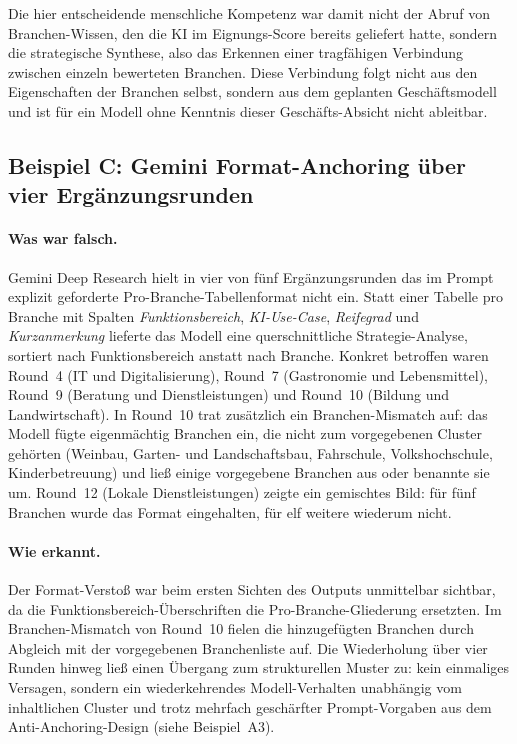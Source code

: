 \documentclass[a4paper,11pt]{article}
\begin{document}
Die hier entscheidende menschliche Kompetenz war damit nicht der Abruf
von Branchen-Wissen, den die KI im Eignungs-Score bereits geliefert
hatte, sondern die strategische Synthese, also das Erkennen einer
tragfähigen Verbindung zwischen einzeln bewerteten Branchen. Diese
Verbindung folgt nicht aus den Eigenschaften der Branchen selbst,
sondern aus dem geplanten Geschäftsmodell und ist für ein Modell ohne
Kenntnis dieser Geschäfts-Absicht nicht ableitbar.

\subsection{Beispiel C: Gemini Format-Anchoring über vier Ergänzungsrunden}

\paragraph{Was war falsch.}
Gemini Deep Research hielt in vier von fünf Ergänzungsrunden das im
Prompt explizit geforderte Pro-Branche-Tabellenformat nicht ein.
Statt einer Tabelle pro Branche mit Spalten \emph{Funktionsbereich},
\emph{KI-Use-Case}, \emph{Reifegrad} und \emph{Kurzanmerkung} lieferte
das Modell eine querschnittliche Strategie-Analyse, sortiert nach
Funktionsbereich anstatt nach Branche. Konkret betroffen waren
Round~4 (IT und Digitalisierung), Round~7 (Gastronomie und
Lebensmittel), Round~9 (Beratung und Dienstleistungen) und Round~10
(Bildung und Landwirtschaft). In Round~10 trat zusätzlich ein
Branchen-Mismatch auf: das Modell fügte eigenmächtig Branchen ein, die
nicht zum vorgegebenen Cluster gehörten (Weinbau, Garten- und
Landschaftsbau, Fahrschule, Volkshochschule, Kinderbetreuung) und ließ
einige vorgegebene Branchen aus oder benannte sie um. Round~12
(Lokale Dienstleistungen) zeigte ein gemischtes Bild: für fünf
Branchen wurde das Format eingehalten, für elf weitere wiederum nicht.

\paragraph{Wie erkannt.}
Der Format-Verstoß war beim ersten Sichten des Outputs unmittelbar
sichtbar, da die Funktionsbereich-Überschriften die Pro-Branche-Gliederung
ersetzten. Im Branchen-Mismatch von Round~10 fielen die hinzugefügten
Branchen durch Abgleich mit der vorgegebenen Branchenliste auf. Die
Wiederholung über vier Runden hinweg ließ einen Übergang zum
strukturellen Muster zu: kein einmaliges Versagen, sondern ein
wiederkehrendes Modell-Verhalten unabhängig vom inhaltlichen
Cluster und trotz mehrfach geschärfter Prompt-Vorgaben aus dem
Anti-Anchoring-Design (siehe Beispiel~A3).
\end{document}
